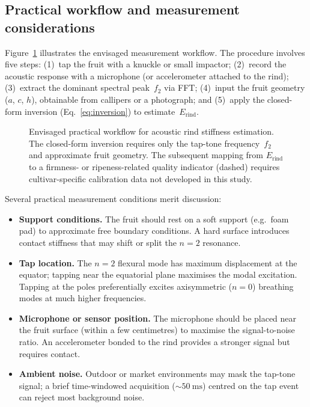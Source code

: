 \subsection{Practical workflow and measurement considerations}
\label{sec:practical_workflow}

Figure~\ref{fig:workflow} illustrates the envisaged measurement
workflow.  The procedure involves five steps: (1)~tap the fruit with a
knuckle or small impactor; (2)~record the acoustic response with a
microphone (or accelerometer attached to the rind); (3)~extract the
dominant spectral peak~$f_2$ via FFT; (4)~input the fruit geometry
($a$, $c$, $h$), obtainable from callipers or a photograph; and
(5)~apply the closed-form inversion (Eq.~\ref{eq:inversion}) to
estimate~$E_{\mathrm{rind}}$.

\begin{figure}[t]
  \centering
  \caption{Envisaged practical workflow for acoustic rind stiffness
    estimation.  The closed-form inversion requires only the
    tap-tone frequency~$f_2$ and approximate fruit geometry.
    The subsequent mapping from $E_{\mathrm{rind}}$ to a firmness- or
    ripeness-related quality indicator (dashed) requires
    cultivar-specific calibration data not developed in this study.}
  \label{fig:workflow}
\end{figure}

Several practical measurement conditions merit discussion:
\begin{itemize}
  \item \textbf{Support conditions.}  The fruit should rest on a soft
    support (e.g.\ foam pad) to approximate free boundary conditions.
    A hard surface introduces contact stiffness that may shift or
    split the $n = 2$ resonance.
  \item \textbf{Tap location.}  The $n = 2$ flexural mode has
    maximum displacement at the equator; tapping near the equatorial
    plane maximises the modal excitation.  Tapping at the poles
    preferentially excites axisymmetric ($n = 0$) breathing modes at
    much higher frequencies.
  \item \textbf{Microphone or sensor position.}  The microphone
    should be placed near the fruit surface (within a few centimetres)
    to maximise the signal-to-noise ratio.  An accelerometer bonded
    to the rind provides a stronger signal but requires contact.
  \item \textbf{Ambient noise.}  Outdoor or market environments may
    mask the tap-tone signal; a brief time-windowed acquisition
    ($\sim\SI{50}{\milli\second}$) centred on the tap event can
    reject most background noise.
\end{itemize}

